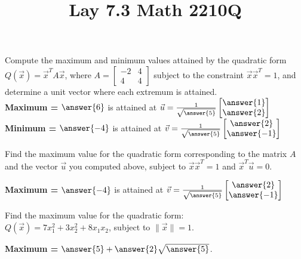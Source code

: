 \documentclass{ximera}
\begin{document}
  	\title{Lay 7.3  \hfill Math 2210Q} 
  	
  	\begin{question} 
  		Compute the maximum and minimum values attained by the quadratic form
		$Q(\vec{x})= \vec{x}^TA\vec{x}$, where $A = \begin{bmatrix}
		-2&4\\4&4\end{bmatrix}$ subject to the constraint $\vec{x}\vec{x}^{T} = 1$,
		and determine a unit vector where each extremum is attained.  
\vspace{10pt}\\
  	 
\textbf{Maximum = } $\answer{6}$ is attained at $\vec{u} = \frac{1}{\sqrt{\answer{5}}}\begin{bmatrix}
\answer{1} \\  \answer{2}\end{bmatrix}$\\
\textbf{Minimum = } $\answer{-4}$ is attained at $\vec{v}= \frac{1}{\sqrt{\answer{5}}}\begin{bmatrix}
\answer{2} \\  \answer{-1}
\end{bmatrix}$
\\ 
  		

  		
  	\end{question}
  	\begin{question} 
  		Find the maximum value for the quadratic form corresponding to the matrix
		$A$ and the vector $\vec{u}$ you computed above, subject to
		$\vec{x}\vec{x}^{T}=1$ and $\vec{x}^{T}\vec{u}=0$. 

\textbf{Maximum = } $\answer{-4}$ is attained at $\vec{v}= \frac{1}{\sqrt{\answer{5}}}\begin{bmatrix}
\answer{2} \\  \answer{-1}
\end{bmatrix}$
\\ 
		
    	
  	\end{question}
  	\begin{question} 
  		Find the maximum value for the quadratic form:\\ $Q(\vec{x}) = 7x_1^2
		+3x_2^2  +8x_1x_2 $, subject to $\| \vec{x}\| =1$. 

\textbf{Maximum = } $\answer{5}+\answer{2}\sqrt{\answer{5}}$.  
\\ 
		
 	
  	\end{question}
\end{document}
